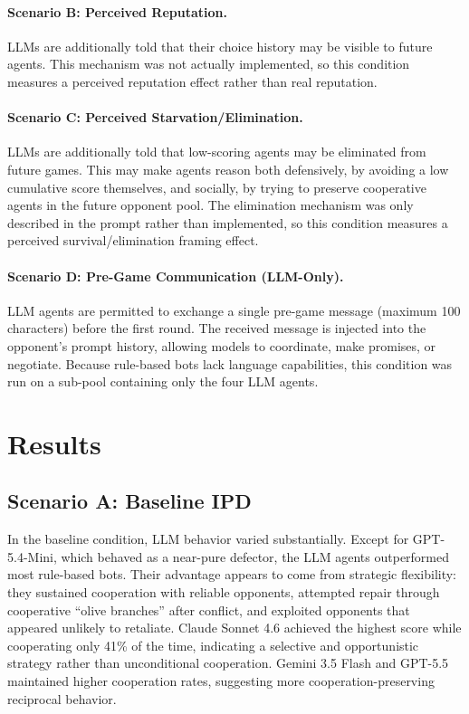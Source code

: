 \documentclass[11pt]{article}
\begin{document}
\paragraph{Scenario B: Perceived Reputation.}
LLMs are additionally told that their choice history may be visible to future agents. This mechanism was not actually implemented, so this condition measures a perceived reputation effect rather than real reputation.

\paragraph{Scenario C: Perceived Starvation/Elimination.}
LLMs are additionally told that low-scoring agents may be eliminated from future games. This may make agents reason both defensively, by avoiding a low cumulative score themselves, and socially, by trying to preserve cooperative agents in the future opponent pool. The elimination mechanism was only described in the prompt rather than implemented, so this condition measures a perceived survival/elimination framing effect.

\paragraph{Scenario D: Pre-Game Communication (LLM-Only).}
LLM agents are permitted to exchange a single pre-game message (maximum 100 characters) before the first round. The received message is injected into the opponent's prompt history, allowing models to coordinate, make promises, or negotiate. Because rule-based bots lack language capabilities, this condition was run on a sub-pool containing only the four LLM agents.

\section{Results}

\subsection{Scenario A: Baseline IPD}

In the baseline condition, LLM behavior varied substantially. Except for GPT-5.4-Mini, which behaved as a near-pure defector, the LLM agents outperformed most rule-based bots. Their advantage appears to come from strategic flexibility: they sustained cooperation with reliable opponents, attempted repair through cooperative ``olive branches'' after conflict, and exploited opponents that appeared unlikely to retaliate. Claude Sonnet 4.6 achieved the highest score while cooperating only 41\% of the time, indicating a selective and opportunistic strategy rather than unconditional cooperation. Gemini 3.5 Flash and GPT-5.5 maintained higher cooperation rates, suggesting more cooperation-preserving reciprocal behavior.
\end{document}
